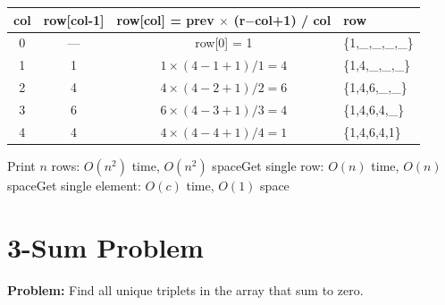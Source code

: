 \documentclass[12pt,a4paper,oneside]{book}
\begin{document}
\begin{dryrun}[Dry Run: getRow(4) --- row index 4 = \{1, 4, 6, 4, 1\}]
\begin{center}
\begin{tabular}{cccl}
\toprule
\textbf{col} & \textbf{row[col-1]} & \textbf{row[col] = prev $\times$ (r$-$col+1) / col} & \textbf{row}\\
\midrule
0 & ---& row[0] = 1                        & \{1,\_,\_,\_,\_\}\\
1 & 1  & $1 \times (4-1+1)/1 = 4$          & \{1,4,\_,\_,\_\}\\
2 & 4  & $4 \times (4-2+1)/2 = 6$          & \{1,4,6,\_,\_\}\\
3 & 6  & $6 \times (4-3+1)/3 = 4$          & \{1,4,6,4,\_\}\\
4 & 4  & $4 \times (4-4+1)/4 = 1$          & \{1,4,6,4,1\}\\
\bottomrule
\end{tabular}
\end{center}
\end{dryrun}

\begin{complexity}
Print $n$ rows: $O(n^2)$ time, $O(n^2)$ space\quad Get single row: $O(n)$ time, $O(n)$ space\quad Get single element: $O(c)$ time, $O(1)$ space
\end{complexity}

\section{3-Sum Problem}

\textbf{Problem:} Find all unique triplets in the array that sum to zero.
\end{document}

